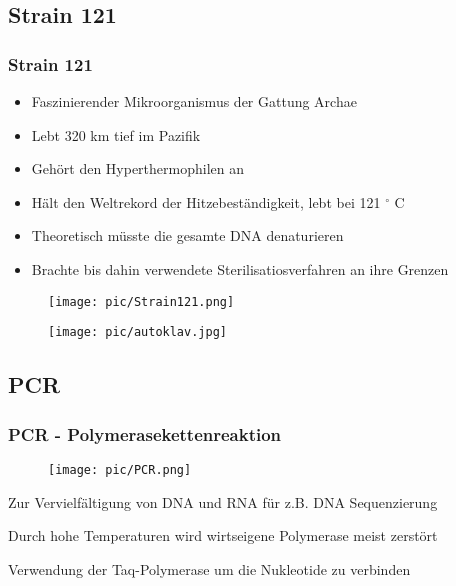 

\subsection*{Strain 121}
\begin{frame}
 \frametitle{Strain 121}
\begin{itemize}
\item Faszinierender Mikroorganismus der Gattung Archae
\item Lebt 320 km tief im Pazifik
\item Gehört den Hyperthermophilen an
\item Hält den Weltrekord der Hitzebeständigkeit, lebt bei 121 $^\circ$ C
\item Theoretisch müsste die gesamte DNA denaturieren
\item Brachte bis dahin verwendete Sterilisatiosverfahren an ihre Grenzen
\end{itemize}
\centering
\begin{minipage}{3.5cm}
		\centering
\begin{figure}[h]
	\centering
		\texttt{[image: pic/Strain121.png]}
\end{figure}
	\cite{ST14}
\end{minipage}
\qquad
\begin{minipage}{4cm}
		\centering
\begin{figure}[h]
	\centering
		\texttt{[image: pic/autoklav.jpg]}
\end{figure}
	\cite{AK14}
\end{minipage}
\end{frame}


\subsection*{PCR}
\begin{frame}
\frametitle{PCR - Polymerasekettenreaktion}
\begin{figure}[h]
	\centering
		\texttt{[image: pic/PCR.png]}
\end{figure}
\centering
	\cite{PCR14}

\begin{itemize}
\small{
\item Zur Vervielfältigung von DNA und RNA für z.B. DNA Sequenzierung
\item Durch hohe Temperaturen wird wirtseigene Polymerase meist zerstört
\item Verwendung der Taq-Polymerase um die Nukleotide zu verbinden}
\end{itemize}
\end{frame}

